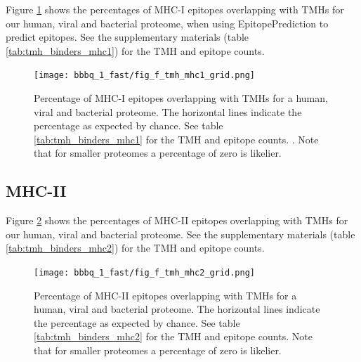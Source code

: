 Figure \ref{fig:1} shows the percentages of MHC-I epitopes overlapping 
with TMHs for our human, viral and bacterial proteome,
when using EpitopePrediction to predict epitopes.
See the supplementary materials (table \ref{tab:tmh_binders_mhc1}) 
for the TMH and epitope counts.



\begin{figure}[!htbp]
  \texttt{[image: bbbq\_1\_fast/fig\_f\_tmh\_mhc1\_grid.png]}
  \caption{
    Percentage of MHC-I epitopes overlapping with TMHs
    for a human, viral and bacterial proteome.
    The horizontal lines indicate the percentage as expected by chance.
    See table \ref{tab:tmh_binders_mhc1} for the TMH and epitope counts.
    .
    Note that for smaller proteomes a percentage of zero is likelier.
  }
  \label{fig:1}
\end{figure}

\subsection{MHC-II}

Figure \ref{fig:2} shows the percentages of MHC-II epitopes overlapping 
with TMHs for our human, viral and bacterial proteome.
See the supplementary materials (table \ref{tab:tmh_binders_mhc2}) 
for the TMH and epitope counts.

\begin{figure}[!htbp]
  \texttt{[image: bbbq\_1\_fast/fig\_f\_tmh\_mhc2\_grid.png]}
  \caption{
    Percentage of MHC-II epitopes overlapping with TMHs
    for a human, viral and bacterial proteome.
    The horizontal lines indicate the percentage as expected by chance.
    See table \ref{tab:tmh_binders_mhc2} for the TMH and epitope counts.
    Note that for smaller proteomes a percentage of zero is likelier.
  }
  \label{fig:2}
\end{figure}

